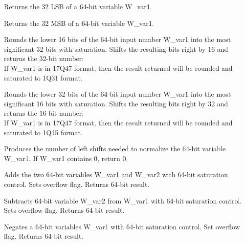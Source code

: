 
Returns the 32 LSB of a 64-bit variable W\_var1.


Returns the 32 MSB of a 64-bit variable W\_var1.


Rounds the lower 16 bits of the 64-bit input number W\_var1 into the most significant 32 bits with saturation.
Shifts the resulting bits right by 16 and returns the 32-bit number:\\
If W\_var1 is in 17Q47 format, then the result returned will be rounded and saturated to 1Q31 format.


Rounds the lower 32 bits of the 64-bit input number W\_var1 into the most significant 16 bits with saturation.
Shifts the resulting bits right by 32 and returns the 16-bit number:\\
If W\_var1 is in 17Q47 format, then the result returned will be rounded and saturated to 1Q15 format.


Produces the number of left shifts needed to normalize the 64-bit variable W\_var1.
If W\_var1 contains 0, return 0.


Adds the two 64-bit variables W\_var1 and W\_var2 with 64-bit saturation control.
Sets overflow flag. Returns 64-bit result.


Subtracts 64-bit variable W\_var2 from W\_var1 with 64-bit saturation control.
Sets overflow flag. Returns 64-bit result.


Negates a 64-bit variables W\_var1 with 64-bit saturation control.
Set overflow flag. Returns 64-bit result.

